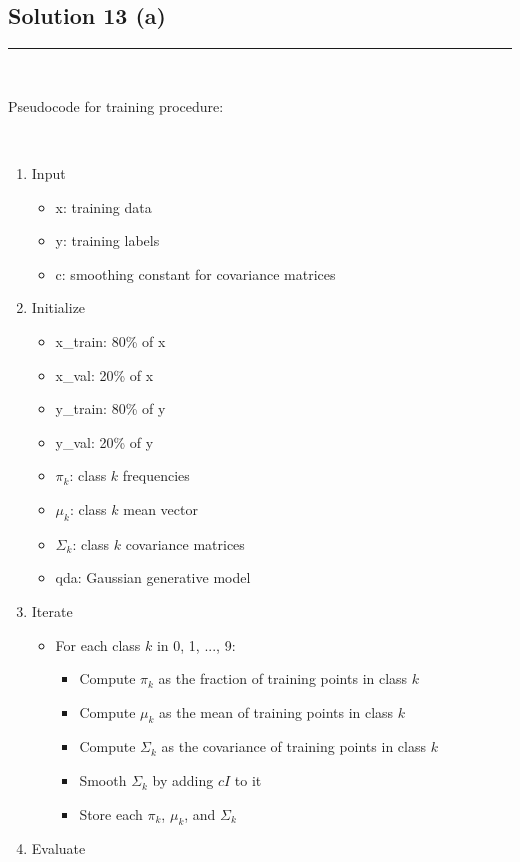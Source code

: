 \documentclass{article}
\begin{document}
\subsection*{Solution 13 (a)}
\noindent\rule{\textwidth}{0.4pt}\\
\parbox{\textwidth}{Pseudocode for training procedure:}\\
\begin{enumerate}
\item Input
\begin{itemize}
    \item x: training data
    \item y: training labels
    \item c: smoothing constant for covariance matrices
\end{itemize}
\item Initialize
\begin{itemize}
    \item x\_train: 80\% of x
    \item x\_val: 20\% of x
    \item y\_train: 80\% of y
    \item y\_val: 20\% of y
    \item $\pi_k$: class $k$ frequencies
    \item $\mu_k$: class $k$ mean vector
    \item $\Sigma_k$: class $k$ covariance matrices
    \item qda: Gaussian generative model
\end{itemize}
\item Iterate
\begin{itemize}
    \item For each class $k$ in {0, 1, ..., 9}:
    \begin{itemize}
        \item Compute $\pi_k$ as the fraction of training points in class $k$
        \item Compute $\mu_k$ as the mean of training points in class $k$
        \item Compute $\Sigma_k$ as the covariance of training points in class $k$
        \item Smooth $\Sigma_k$ by adding $cI$ to it
        \item Store each $\pi_k$, $\mu_k$, and $\Sigma_k$
    \end{itemize}
\end{itemize}
\item Evaluate
\begin{itemize}

\end{itemize}
\end{enumerate}
\end{document}
